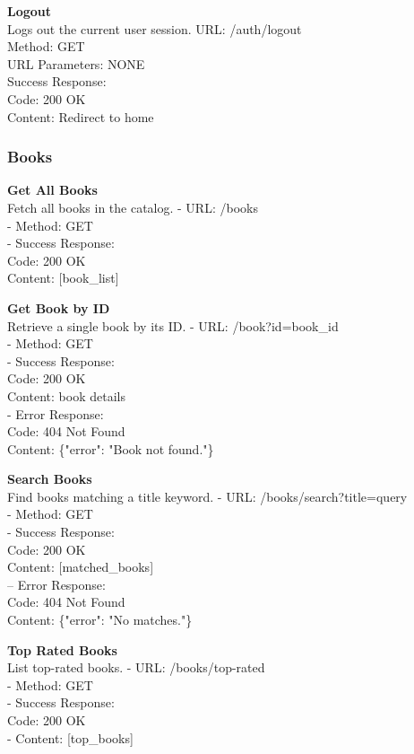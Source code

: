 \textbf{Logout} \\
Logs out the current user session.
URL: /auth/logout \\
Method: GET \\
URL Parameters: NONE \\
Success Response: \\
Code: 200 OK \\
Content: Redirect to home

\subsubsection*{Books}

\textbf{Get All Books} \\
Fetch all books in the catalog.
- URL: /books \\
- Method: GET \\
- Success Response: \\
Code: 200 OK \\
Content: [book\_list]

\textbf{Get Book by ID} \\
Retrieve a single book by its ID.
- URL: /book?id={book\_id} \\
- Method: GET \\
- Success Response: \\
Code: 200 OK \\
Content: {book details} \\
- Error Response: \\
Code: 404 Not Found \\
Content: \{"error": "Book not found."\}

\textbf{Search Books} \\
Find books matching a title keyword.
- URL: /books/search?title={query} \\
- Method: GET \\
- Success Response: \\
Code: 200 OK \\
Content: [matched\_books] \\
– Error Response: \\
Code: 404 Not Found \\
Content: \{"error": "No matches."\}

\textbf{Top Rated Books} \\
List top-rated books.
- URL: /books/top-rated \\
- Method: GET \\
- Success Response: \\
Code: 200 OK \\
- Content: [top\_books]

